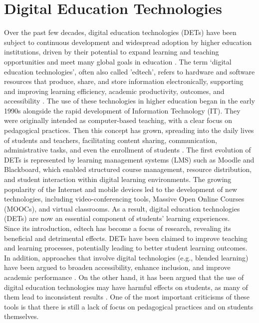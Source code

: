 \section{Digital Education Technologies}
\label{sec:2.1_DETs}
Over the past few decades, digital education technologies (DETs) have been subject to continuous development and widespread adoption by higher education institutions, driven by their potential to expand learning and teaching opportunities and meet many global goals in education \cite{volery_critical_2000}.
The term ‘digital education technologies’, often also called 'edtech’, refers to hardware and software resources that produce, share, and store information electronically, supporting and improving learning efficiency, academic productivity, outcomes, and accessibility \cite{sokhulu_students_2021}. 
The use of these technologies in higher education began in the early 1990s alongside the rapid development of Information Technology (IT). They were originally intended as computer-based teaching, with a clear focus on pedagogical practices. Then this concept has grown, spreading into the daily lives of students and teachers, facilitating content sharing, communication, administrative tasks, and even the enrollment of students \cite{lacka_examining_2021}. The first evolution of DETs is represented by learning management systems (LMS) such as Moodle and Blackboard, which enabled structured course management, resource distribution, and student interaction within digital learning environments. The growing popularity of the Internet and mobile devices led to the development of new technologies, including video-conferencing tools, Massive Open Online Courses (MOOCs), and virtual classrooms\cite{haleem_understanding_2022}. As a result, digital education technologies (DETs) are now an essential component of students’ learning experiences. \\
Since its introduction, edtech has become a focus of research, revealing its beneficial and detrimental effects\cite{lacka_examining_2021}. DETs have been claimed to improve teaching and learning processes, potentially leading to better student learning outcomes. In addition, approaches that involve digital technologies (e.g., blended learning) have been argued to broaden accessibility, enhance inclusion, and improve academic performance \cite{tulinayo_digital_2018}. On the other hand, it has been argued that the use of digital education technologies may have harmful effects on students, as many of them lead to inconsistent results \cite{lacka_examining_2021}.
One of the most important criticisms of these tools is that there is still a lack of focus on pedagogical practices and on students themselves.

